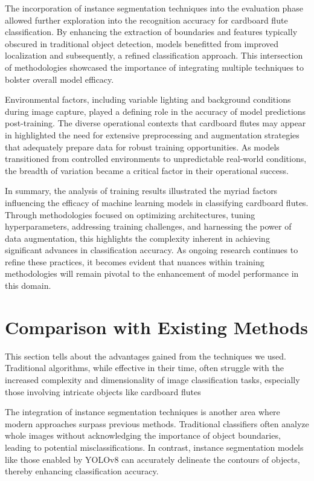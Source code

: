 The incorporation of instance segmentation techniques into the evaluation phase allowed further exploration into the recognition accuracy for cardboard flute classification. By enhancing the extraction of boundaries and features typically obscured in traditional object detection, models benefitted from improved localization and subsequently, a refined classification approach. This intersection of methodologies showcased the importance of integrating multiple techniques to bolster overall model efficacy.

Environmental factors, including variable lighting and background conditions during image capture, played a defining role in the accuracy of model predictions post-training. The diverse operational contexts that cardboard flutes may appear in highlighted the need for extensive preprocessing and augmentation strategies that adequately prepare data for robust training opportunities. As models transitioned from controlled environments to unpredictable real-world conditions, the breadth of variation became a critical factor in their operational success.

In summary, the analysis of training results illustrated the myriad factors influencing the efficacy of machine learning models in classifying cardboard flutes. Through methodologies focused on optimizing architectures, tuning hyperparameters, addressing training challenges, and harnessing the power of data augmentation, this highlights the complexity inherent in achieving significant advances in classification accuracy. As ongoing research continues to refine these practices, it becomes evident that nuances within training methodologies will remain pivotal to the enhancement of model performance in this domain.

\section{Comparison with Existing Methods}

This section tells about the advantages gained from the techniques we used. Traditional algorithms, while effective in their time, often struggle with the increased complexity and dimensionality of image classification tasks, especially those involving intricate objects like cardboard flutes

The integration of instance segmentation techniques is another area where modern approaches surpass previous methods. Traditional classifiers often analyze whole images without acknowledging the importance of object boundaries, leading to potential misclassifications. In contrast, instance segmentation models like those enabled by YOLOv8 can accurately delineate the contours of objects, thereby enhancing classification accuracy. 

